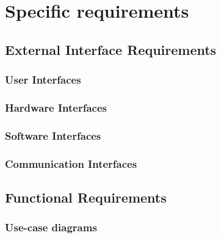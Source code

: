 



\chapter{Specific requirements}
	\section{External Interface Requirements}
		\subsection{User Interfaces}
		\subsection{Hardware Interfaces}
		\subsection{Software Interfaces}
		\subsection{Communication Interfaces}
	\section{Functional Requirements}
		\subsection{Use-case diagrams}

